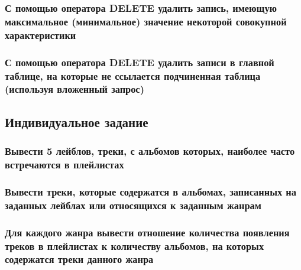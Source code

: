 \subsubsection{С помощью оператора DELETE удалить запись, имеющую максимальное (минимальное) значение некоторой совокупной характеристики}



\subsubsection{С помощью оператора DELETE удалить записи в главной таблице, на которые не ссылается подчиненная таблица (используя вложенный запрос)}



\subsection{Индивидуальное задание}

\subsubsection{Вывести 5 лейблов, треки, с альбомов которых, наиболее часто встречаются в плейлистах}



\subsubsection{Вывести треки, которые содержатся в альбомах, записанных на заданных лейблах или относящихся к заданным жанрам}



\subsubsection{Для каждого жанра вывести отношение количества появления треков в плейлистах к количеству альбомов, на которых содержатся треки данного жанра}

